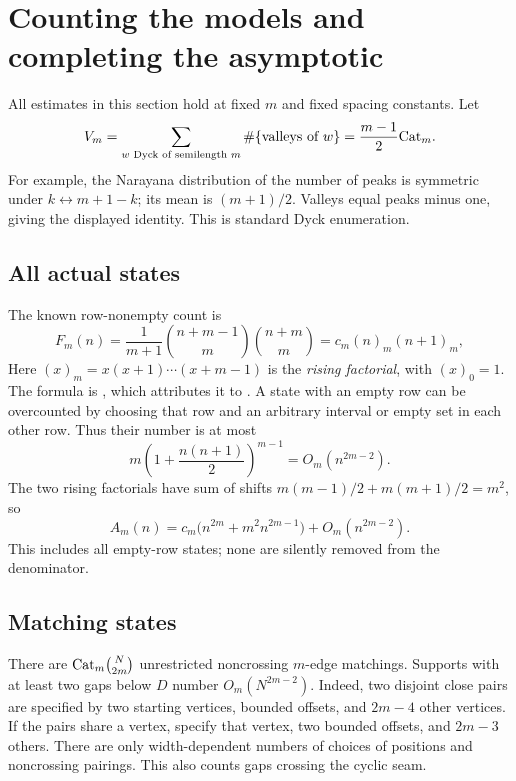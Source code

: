 \section{Counting the models and completing the asymptotic}\label{sec:counting}
All estimates in this section hold at fixed $m$ and fixed spacing constants. Let
\[
 V_m=\sum_{w\text{ Dyck of semilength }m}\#\{\text{valleys of }w\}
     =\frac{m-1}{2}\mathrm{Cat}_m.
\]
For example, the Narayana distribution of the number of peaks is symmetric under $k\leftrightarrow m+1-k$; its mean is $(m+1)/2$. Valleys equal peaks minus one, giving the displayed identity. This is standard Dyck enumeration.

\subsection{All actual states}
The known row-nonempty count is
\begin{equation}\label{eq:narayana}
 F_m(n)=\frac1{m+1}\binom{n+m-1}{m}\binom{n+m}{m}
       =c_m(n)_m(n+1)_m,
\end{equation}
Here $(x)_m=x(x+1)\cdots(x+m-1)$ is the \emph{rising factorial}, with $(x)_0=1$. The formula is \cite[Theorem 2.7, arXiv v1]{ELLMSW}, which attributes it to \cite[Theorem 4.4, arXiv v2]{ELMSW}. A state with an empty row can be overcounted by choosing that row and an arbitrary interval or empty set in each other row. Thus their number is at most
\[
 m\left(1+\frac{n(n+1)}2\right)^{m-1}=O_m(n^{2m-2}).
\]
The two rising factorials have sum of shifts $m(m-1)/2+m(m+1)/2=m^2$, so
\begin{equation}\label{eq:denominator}
 A_m(n)=c_m\bigl(n^{2m}+m^2n^{2m-1}\bigr)+O_m(n^{2m-2}).
\end{equation}
This includes all empty-row states; none are silently removed from the denominator.

\subsection{Matching states}
There are $\mathrm{Cat}_m\binom N{2m}$ unrestricted noncrossing $m$-edge matchings. Supports with at least two gaps below $D$ number $O_m(N^{2m-2})$. Indeed, two disjoint close pairs are specified by two starting vertices, bounded offsets, and $2m-4$ other vertices. If the pairs share a vertex, specify that vertex, two bounded offsets, and $2m-3$ others. There are only width-dependent numbers of choices of positions and noncrossing pairings. This also counts gaps crossing the cyclic seam.

